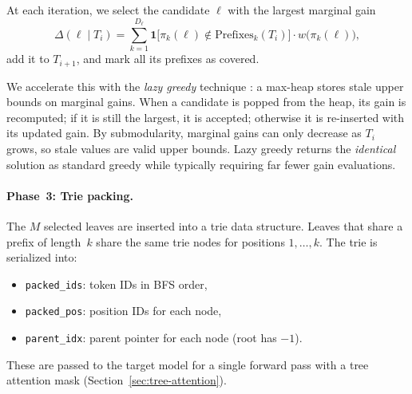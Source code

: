 At each iteration, we select the candidate $\ell$ with the largest
marginal gain
\[
  \Delta(\ell \mid T_i) = \sum_{k=1}^{D_\ell}
    \mathbf{1}\bigl[\pi_k(\ell) \notin \mathrm{Prefixes}_k(T_i)\bigr]
    \cdot w\bigl(\pi_k(\ell)\bigr),
\]
add it to $T_{i+1}$, and mark all its prefixes as covered.

We accelerate this with the \emph{lazy greedy} technique
\citep{minoux1978}: a max-heap stores stale upper bounds on marginal
gains.  When a candidate is popped from the heap, its gain is
recomputed; if it is still the largest, it is accepted; otherwise it is
re-inserted with its updated gain.  By submodularity, marginal gains
can only decrease as $T_i$ grows, so stale values are valid upper
bounds.  Lazy greedy returns the \emph{identical} solution as standard
greedy while typically requiring far fewer gain evaluations.

\paragraph{Phase~3: Trie packing.}
The $M$ selected leaves are inserted into a trie data structure.
Leaves that share a prefix of length~$k$ share the same trie nodes for
positions $1, \dots, k$.  The trie is serialized into:
\begin{itemize}[nosep,leftmargin=*]
  \item \texttt{packed\_ids}: token IDs in BFS order,
  \item \texttt{packed\_pos}: position IDs for each node,
  \item \texttt{parent\_idx}: parent pointer for each node (root has $-1$).
\end{itemize}
These are passed to the target model for a single forward pass with a
tree attention mask (Section~\ref{sec:tree-attention}).

